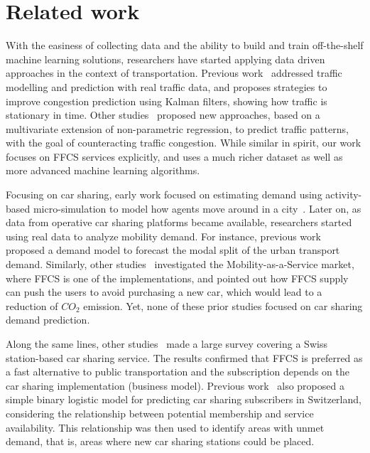 \section{Related work}
\label{sec:related_works}

With the easiness of collecting data and the ability to build and train off-the-shelf machine learning solutions, researchers have started applying data driven approaches in the context of transportation.
Previous work~\citep{2_okutani1984dynamic} addressed traffic modelling and prediction with real traffic data, and proposes strategies to improve congestion prediction using Kalman filters, showing how traffic is stationary in time.  
Other studies~\citep{3_clark2003traffic} proposed new approaches, based on a multivariate extension of non-parametric regression, to predict traffic patterns, with the goal of counteracting traffic congestion. 
While similar in spirit, our work focuses on FFCS services explicitly, and uses a much richer dataset as well as more advanced machine learning algorithms.

Focusing on car sharing, early work focused on estimating demand using activity-based micro-simulation to model how agents move around in a city~\citep{ciari2013estimation}. 
Later on, as data from operative car sharing platforms became available, researchers started using real data to analyze mobility demand. For instance, previous work~\citep{catalano2008car,14_firnkorn2011will} proposed a demand model to forecast the modal split of the urban transport demand. Similarly, other studies~\citep{13_firnkorn2012selling} investigated the Mobility-as-a-Service market, where FFCS is one of the implementations, and pointed out how FFCS supply can push the users to avoid purchasing a new car, which would lead to a reduction of $CO_{2}$ emission. Yet, none of these prior studies focused on car sharing demand prediction. 

Along the same lines, other studies~\citep{18_becker2017comparing} made a large survey covering a Swiss station-based car sharing service. The results confirmed that FFCS is preferred as a fast alternative to public transportation and the subscription depends on the car sharing implementation (business model). 
Previous work~\citep{17_ciari2016evaluating} also proposed a simple binary logistic model for predicting car sharing subscribers in Switzerland, considering the relationship between potential membership and service availability. This relationship was then used to identify areas with unmet demand, that is, areas where new car sharing stations could be placed. 

